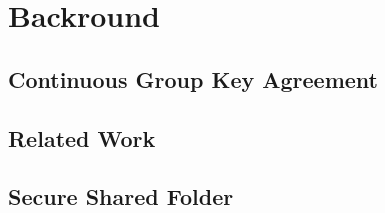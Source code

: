 \chapter{Backround}\label{ch:background}

\section{Continuous Group Key Agreement}


\section{Related Work}

\section{Secure Shared Folder}

